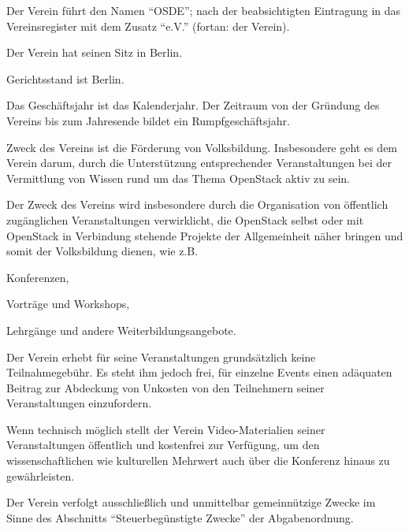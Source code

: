 \documentclass[draft]{scrartcl}
\newcommand{\VereinsName}{OSDE}
\begin{document}
\pagebreak
\ihead{\footnotesize \thetitle}
\begin{contract}


Der Verein führt den Namen "`\VereinsName"'; nach der beabsichtigten
Eintragung in das Vereinsregister mit dem Zusatz "`e.V."' (fortan: der
Verein).

Der Verein hat seinen Sitz in Berlin.

Gerichtsstand ist Berlin.

Das Geschäftsjahr ist das Kalenderjahr. Der Zeitraum von der Gründung des
Vereins bis zum Jahresende bildet ein Rumpfgeschäftsjahr.


\parnumberfalse

\label{Zweck}
Zweck des Vereins ist die Förderung von Volksbildung. Insbesondere geht es
dem Verein darum, durch die Unterstützung entsprechender Veranstaltungen
bei der Vermittlung von Wissen rund um das Thema OpenStack aktiv zu sein.

Der Zweck des Vereins wird insbesondere durch die Organisation von öffentlich
zu\-gäng\-li\-chen Veranstaltungen verwirklicht, die OpenStack selbst oder
mit OpenStack in Verbindung stehende Projekte der Allgemeinheit näher
bringen und somit der Volksbildung dienen, wie z.B.

\begin{compactitem}
  \item Konferenzen,
  \item Vorträge und Workshops,
  \item Lehrgänge und andere Weiterbildungsangebote.
\end{compactitem}

Der Verein erhebt für seine Veranstaltungen grundsätzlich keine Teilnahmegebühr.
Es steht ihm jedoch frei, für einzelne Events einen adäquaten Beitrag zur 
Abdeckung von Unkosten von den Teilnehmern seiner Veranstaltungen einzufordern.

Wenn technisch möglich stellt der Verein Video-Materialien seiner Veranstaltungen
öf\-fent\-lich und kostenfrei zur Verfügung, um den wissenschaftlichen wie kulturellen
Mehrwert auch über die Konferenz hinaus zu gewährleisten.

\label{Gemeinnuetzigkeit}

Der Verein verfolgt ausschließlich und unmittelbar gemeinnützige Zwecke im
Sinne des Abschnitts "`Steuerbegünstigte Zwecke"' der Abgabenordnung.


\end{contract}
\end{document}
